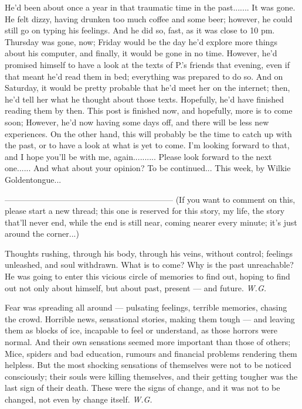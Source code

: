 He'd been about once a year in that traumatic time in the past.......
It was gone. He felt dizzy, having drunken too much coffee and some beer; however, he could still go on typing his feelings. And he did so, fast, as it was close to 10 pm. 
Thursday was gone, now; Friday would be the day he'd explore more things about his computer, and finally, it would be gone in no time. However, he'd promised himself to have a look at the texts of P.'s friends that evening, even if that meant he'd read them in bed; everything was prepared to do so. 
And on Saturday, it would be pretty probable that he'd meet her on the internet; then, he'd tell her what he thought about those texts. 
Hopefully, he'd have finished reading them by then. 
This post is finished now, and hopefully, more is to come soon; However, he'd now having some days off, and there will be less new experiences. On the other hand, this will probably be the time to catch up with the past, or to have a look at what is yet to come. 
I'm looking forward to that, and I hope you'll be with me, again..........
Please look forward to the next one......
And what about your opinion?
To be continued...
This week, by Wilkie Goldentongue...

--------------------------------------------------------------
(If you want to comment on this, please start a new thread; this one is reserved for this story, my life, the story that'll never end, while the end is still near, coming nearer every minute; it's just around the corner...)

Thoughts rushing, 
through his body, 
through his veins, 
without control; 
feelings unleashed, 
and soul withdrawn. 
What is to come? 
Why is the past unreachable? 
He was going to enter this vicious circle 
of memories 
to find out, 
hoping to find out not only about himself, 
but about past, present --- 
and future. 
\emph{W.G.}

Fear was spreading all around --- 
pulsating feelings, 
terrible memories, 
chasing the crowd. 
Horrible news, 
sensational stories, 
making them tough --- 
and leaving them as blocks of ice, 
incapable to feel or understand, 
as those horrors were normal. 
And their own sensations 
seemed more important than those 
of others; 
Mice, spiders and bad education, 
rumours and financial problems 
rendering them helpless. 
But the most shocking sensations 
of themselves 
were not to be noticed 
consciously; 
their souls were killing themselves, 
and their getting tougher 
was the last sign 
of their death. 
These were the signs of change, 
and it was not to be changed, 
not even by change itself. 
\emph{W.G.}

